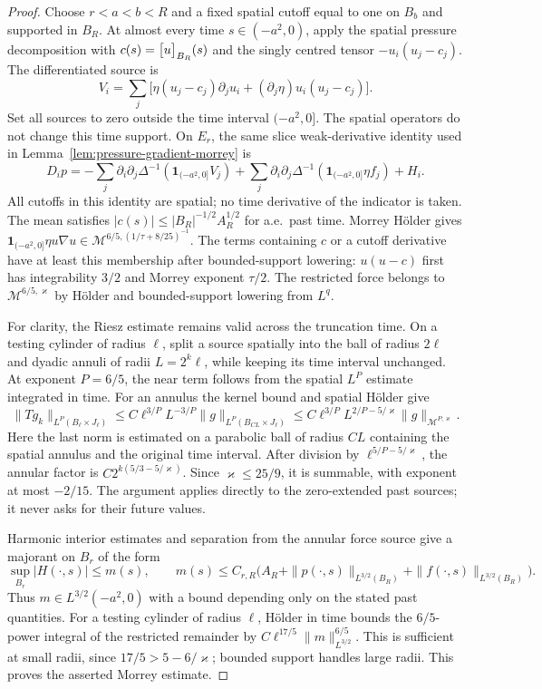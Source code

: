 \documentclass[11pt,reqno]{amsart}
\begin{document}
\begin{proof}
Choose $r<a<b<R$ and a fixed spatial cutoff equal to one on $B_b$
and supported in $B_R$. At almost every time $s\in(-a^2,0)$, apply
the spatial pressure decomposition with
$c(s)=\bigl[u\bigr]_{B_R}(s)$ and the singly centred tensor
$-u_i(u_j-c_j)$. The differentiated source is
\[
 V_i=\sum_j\bigl[\eta(u_j-c_j)\partial_j u_i
                 +(\partial_j\eta)u_i(u_j-c_j)\bigr].
\]
Set all sources to zero outside the time interval $(-a^2,0]$.
The spatial operators do not change this time support. On $E_r$, the
same slice weak-derivative identity used in
Lemma~\ref{lem:pressure-gradient-morrey} is
\[
 D_i p=-\sum_j\partial_i\partial_j\Delta^{-1}
              (\mathbf1_{(-a^2,0]}V_j)
       +\sum_j\partial_i\partial_j\Delta^{-1}
              (\mathbf1_{(-a^2,0]}\eta f_j)+H_i.
\]
All cutoffs in this identity are spatial; no time derivative of the
indicator is taken. The mean satisfies
$|c(s)|\le |B_R|^{-1/2}A_R^{1/2}$ for a.e.\ past time.
Morrey H\"older gives
$\mathbf1_{(-a^2,0]}\eta u\nabla u
 \in\mathcal M^{6/5,(1/\tau+8/25)^{-1}}$.
The terms containing $c$ or a cutoff derivative have at least this
membership after bounded-support lowering: $u(u-c)$ first has
integrability $3/2$ and Morrey exponent $\tau/2$.
The restricted force belongs to $\mathcal M^{6/5,\varkappa}$ by
H\"older and bounded-support lowering from $L^q$.

For clarity, the Riesz estimate remains valid across the truncation
time. On a testing cylinder of radius $\ell$, split a source spatially
into the ball of radius $2\ell$ and dyadic annuli of radii $L=2^k\ell$,
while keeping its time interval unchanged. At exponent $P=6/5$, the
near term follows from the spatial $L^P$ estimate integrated in time.
For an annulus the kernel bound and spatial H\"older give
\[
 \|Tg_k\|_{L^P(B_\ell\times J_\ell)}
 \le C\ell^{3/P}L^{-3/P}
                 \|g\|_{L^P(B_{CL}\times J_\ell)}
 \le C\ell^{3/P}L^{2/P-5/\varkappa}
                 \|g\|_{\mathcal M^{P,\varkappa}}.
\]
Here the last norm is estimated on a parabolic ball of radius $CL$
containing the spatial annulus and the original time interval.
After division by $\ell^{5/P-5/\varkappa}$, the annular factor is
$C2^{k(5/3-5/\varkappa)}$. Since $\varkappa\le25/9$, it is summable,
with exponent at most $-2/15$. The argument applies directly to the
zero-extended past sources; it never asks for their future values.

Harmonic interior estimates and separation from the annular force
source give a majorant on $B_r$ of the form
\[
 \sup_{B_r}|H(\cdot,s)|\le m(s),\qquad
 m(s)\le C_{r,R}\bigl(A_R+
       \|p(\cdot,s)\|_{L^{3/2}(B_R)}+
       \|f(\cdot,s)\|_{L^{3/2}(B_R)}\bigr).
\]
Thus $m\in L^{3/2}(-a^2,0)$ with a bound depending only on the stated
past quantities. For a testing cylinder of radius $\ell$, H\"older in
time bounds the $6/5$-power integral of the restricted remainder by
$C\ell^{17/5}\|m\|_{L^{3/2}}^{6/5}$. This is sufficient at small radii,
since $17/5>5-6/\varkappa$; bounded support handles large radii.
This proves the asserted Morrey estimate.


\end{proof}
\end{document}
